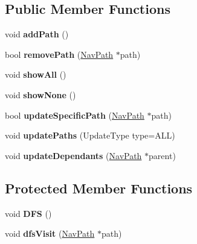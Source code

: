 \subsection*{Public Member Functions}
\begin{DoxyCompactItemize}
\item 
void {\bfseries add\+Path} ()\hypertarget{classPathManager_ab3597d5812ae5ea9b07d1ff190c88fe2}{}\label{classPathManager_ab3597d5812ae5ea9b07d1ff190c88fe2}

\item 
bool {\bfseries remove\+Path} (\hyperlink{classNavPath}{Nav\+Path} $\ast$path)\hypertarget{classPathManager_a76d661475da569ebf62fe782dadf4b95}{}\label{classPathManager_a76d661475da569ebf62fe782dadf4b95}

\item 
void {\bfseries show\+All} ()\hypertarget{classPathManager_a0c6ef973c278f250a39a626f7d123e45}{}\label{classPathManager_a0c6ef973c278f250a39a626f7d123e45}

\item 
void {\bfseries show\+None} ()\hypertarget{classPathManager_a4f1c5403f28aa39b0efe50e173f44b06}{}\label{classPathManager_a4f1c5403f28aa39b0efe50e173f44b06}

\item 
bool {\bfseries update\+Specific\+Path} (\hyperlink{classNavPath}{Nav\+Path} $\ast$path)\hypertarget{classPathManager_a075485253cb431811d2ce8738bba0994}{}\label{classPathManager_a075485253cb431811d2ce8738bba0994}

\item 
void {\bfseries update\+Paths} (Update\+Type type=A\+LL)\hypertarget{classPathManager_a3bb9aa252d68bf6bef6da0787b74b05a}{}\label{classPathManager_a3bb9aa252d68bf6bef6da0787b74b05a}

\item 
void {\bfseries update\+Dependants} (\hyperlink{classNavPath}{Nav\+Path} $\ast$parent)\hypertarget{classPathManager_a8ad544c9c22d4ff7261d97a066caa480}{}\label{classPathManager_a8ad544c9c22d4ff7261d97a066caa480}

\end{DoxyCompactItemize}
\subsection*{Protected Member Functions}
\begin{DoxyCompactItemize}
\item 
void {\bfseries D\+FS} ()\hypertarget{classPathManager_a70e9ccbb490cf4d3cabd831a38f6ff73}{}\label{classPathManager_a70e9ccbb490cf4d3cabd831a38f6ff73}

\item 
void {\bfseries dfs\+Visit} (\hyperlink{classNavPath}{Nav\+Path} $\ast$path)\hypertarget{classPathManager_a97080380aff80f8c28be19dc92fa44ca}{}\label{classPathManager_a97080380aff80f8c28be19dc92fa44ca}

\end{DoxyCompactItemize}
